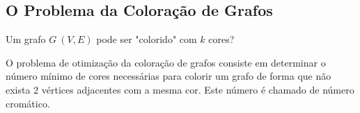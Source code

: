 \subsection{O Problema da Coloração de Grafos}
Um grafo $G\:(V,E)$ pode ser "colorido" com $k$ cores?

O problema de otimização da coloração de grafos consiste em determinar o número mínimo de cores
necessárias para colorir um grafo de forma que não exista 2 vértices adjacentes com a mesma cor. 
Este número é chamado de número cromático.
